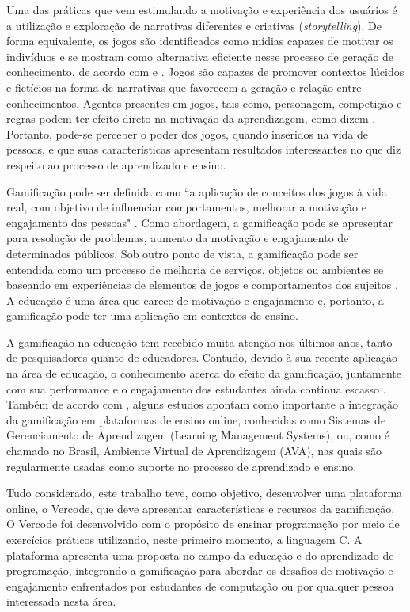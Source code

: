 \documentclass[12pt]{article}
\begin{document}
Uma das práticas que vem estimulando a motivação e experiência dos usuários é a utilização e exploração de narrativas diferentes e criativas (\textit{storytelling}). De forma equivalente, os jogos são identificados como mídias capazes de motivar os indivíduos e se mostram como alternativa eficiente nesse processo de geração de conhecimento, de acordo com \cite{zichermann2011gamification} e \cite{li2012gamicad}. Jogos são capazes de promover contextos lúcidos e fictícios na forma de narrativas que favorecem a geração e relação entre conhecimentos. Agentes presentes em jogos, tais como, personagem, competição e regras podem ter efeito direto na motivação da aprendizagem, como dizem \cite{schmitz2012effects}. Portanto, pode-se perceber o poder dos jogos, quando inseridos na vida de pessoas, e que suas características apresentam resultados interessantes no que diz respeito ao processo de aprendizado e ensino.  

Gamificação pode ser definida como “a aplicação de conceitos dos jogos à vida real, com objetivo de influenciar comportamentos, melhorar a motivação e engajamento das pessoas"  \cite{marczewski2013gamification}. Como abordagem, a gamificação pode se apresentar para resolução de problemas, aumento da motivação e engajamento de determinados públicos. Sob outro ponto de vista, a gamificação pode ser entendida como um processo de melhoria de serviços, objetos ou ambientes se baseando em experiências de elementos de jogos e comportamentos dos sujeitos \cite{hamari2014does}. A educação é uma área que carece de motivação e engajamento e, portanto, a gamificação pode ter uma aplicação em contextos de ensino.

A gamificação na educação tem recebido muita atenção nos últimos anos, tanto de pesquisadores quanto de educadores. Contudo, devido à sua recente aplicação na área de educação, o conhecimento acerca do efeito da gamificação, juntamente com sua performance e o engajamento dos estudantes ainda continua escasso \cite{dicheva2015gamification}. Também de acordo com \cite{dicheva2015gamification}, alguns estudos apontam como importante a integração da gamificação em plataformas de ensino online, conhecidas como Sistemas de Gerenciamento de Aprendizagem (Learning Management Systems), ou, como é chamado no Brasil, Ambiente Virtual de Aprendizagem (AVA), nas quais são regularmente usadas como suporte no processo de aprendizado e ensino.

Tudo considerado, este trabalho teve, como objetivo, desenvolver uma plataforma online, o Vercode, que deve apresentar características e recursos da gamificação. O Vercode foi desenvolvido com o propósito de ensinar programação por meio de exercícios práticos utilizando, neste primeiro momento, a linguagem C. A plataforma apresenta uma proposta no campo da educação e do aprendizado de programação, integrando a gamificação para abordar os desafios de motivação e engajamento enfrentados por estudantes de computação ou por qualquer pessoa interessada nesta área. 
\end{document}
